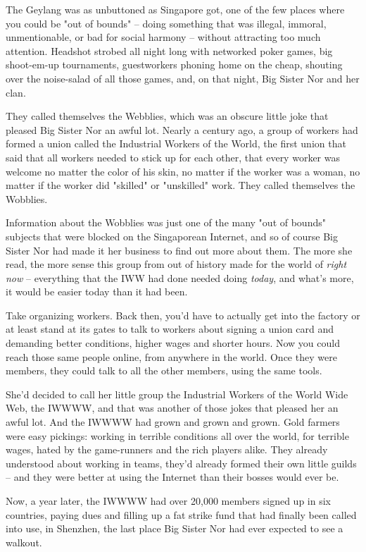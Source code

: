 The Geylang was as unbuttoned as Singapore got, one of the few
places where you could be "out of bounds" -- doing something that
was illegal, immoral, unmentionable, or bad for social harmony --
without attracting too much attention. Headshot strobed all night
long with networked poker games, big shoot-em-up tournaments,
guestworkers phoning home on the cheap, shouting over the
noise-salad of all those games, and, on that night, Big Sister Nor
and her clan.

They called themselves the Webblies, which was an obscure little
joke that pleased Big Sister Nor an awful lot. Nearly a century
ago, a group of workers had formed a union called the Industrial
Workers of the World, the first union that said that all workers
needed to stick up for each other, that every worker was welcome no
matter the color of his skin, no matter if the worker was a woman,
no matter if the worker did "skilled" or "unskilled" work. They
called themselves the Wobblies.

Information about the Wobblies was just one of the many "out of
bounds" subjects that were blocked on the Singaporean Internet, and
so of course Big Sister Nor had made it her business to find out
more about them. The more she read, the more sense this group from
out of history made for the world of \emph{right now} -- everything
that the IWW had done needed doing \emph{today}, and what's more,
it would be easier today than it had been.

Take organizing workers. Back then, you'd have to actually get into
the factory or at least stand at its gates to talk to workers about
signing a union card and demanding better conditions, higher wages
and shorter hours. Now you could reach those same people online,
from anywhere in the world. Once they were members, they could talk
to all the other members, using the same tools.

She'd decided to call her little group the Industrial Workers of
the World Wide Web, the IWWWW, and that was another of those jokes
that pleased her an awful lot. And the IWWWW had grown and grown
and grown. Gold farmers were easy pickings: working in terrible
conditions all over the world, for terrible wages, hated by the
game-runners and the rich players alike. They already understood
about working in teams, they'd already formed their own little
guilds -- and they were better at using the Internet than their
bosses would ever be.

Now, a year later, the IWWWW had over 20,000 members signed up in
six countries, paying dues and filling up a fat strike fund that
had finally been called into use, in Shenzhen, the last place Big
Sister Nor had ever expected to see a walkout.

